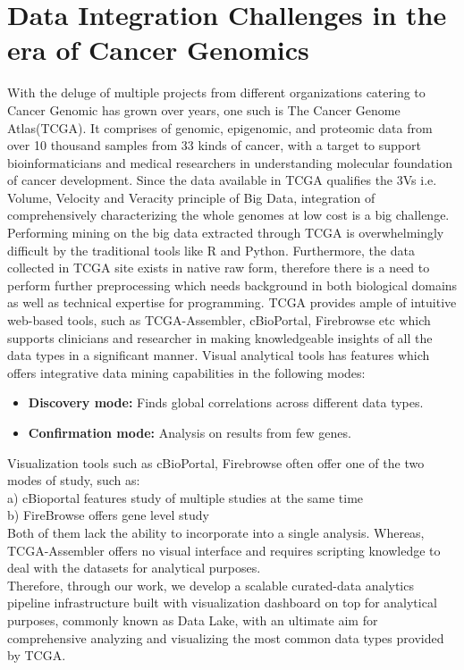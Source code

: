 \section{Data Integration Challenges in the era of Cancer Genomics}
\label{introduction.challenges}
With the deluge of multiple projects from different organizations catering to Cancer Genomic has grown over years, one such is The Cancer Genome Atlas(TCGA). It comprises of genomic, epigenomic, and proteomic data from over 10 thousand samples from 33 kinds of cancer, with a target to support bioinformaticians and medical researchers in understanding molecular foundation of cancer development. Since the data available in TCGA qualifies the 3Vs i.e. Volume, Velocity and Veracity principle of Big Data, integration of comprehensively characterizing the whole genomes at low cost is a big challenge\cite{chen2014big}\cite{lee2016exploring}. Performing mining on the big data extracted through TCGA is overwhelmingly difficult by the traditional tools like R and Python.  Furthermore, the data collected in TCGA site exists in native raw form, therefore there is a need to perform further preprocessing which needs background in both biological domains as well as technical expertise for programming. TCGA provides ample of intuitive web-based tools, such as TCGA-Assembler, cBioPortal, Firebrowse etc which supports clinicians and researcher in making knowledgeable insights of all the data types in a significant manner. Visual analytical tools has features which offers integrative data mining capabilities in the following modes: \\
\begin{itemize}
	\item \textbf{Discovery mode:} Finds global correlations across different data types.
	\item \textbf{Confirmation mode:} Analysis on results from few genes. 

\end{itemize}

Visualization tools such as cBioPortal, Firebrowse often offer one of the two modes of study, such as: \\
a) cBioportal features study of multiple studies at the same time \\
b) FireBrowse offers gene level study \\
Both of them lack the ability to incorporate into a single analysis. Whereas, TCGA-Assembler offers no visual interface and requires scripting knowledge to deal with the datasets for analytical purposes. \\
Therefore, through our work, we develop a scalable curated-data analytics pipeline infrastructure built with visualization dashboard on top for analytical purposes, commonly known as Data Lake, with an ultimate aim for comprehensive analyzing and visualizing the most common data types provided by TCGA.
